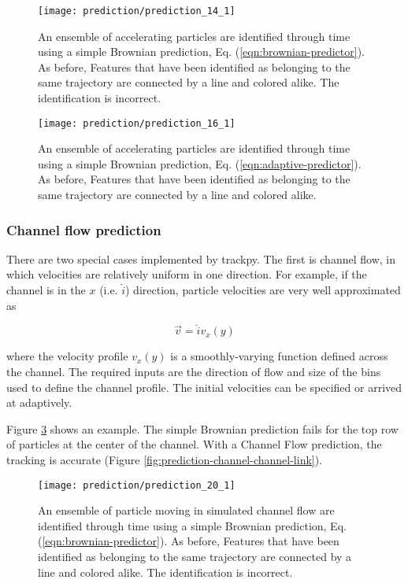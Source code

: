    \begin{figure}
    \centering
    \texttt{[image: prediction/prediction\_14\_1]}
    \caption{\label{fig:prediction-acceleration-brownian-link}An ensemble of accelerating particles are identified through time using a simple Brownian prediction, Eq. (\ref{eqn:brownian-predictor}). As before, Features that have been identified as belonging to the same trajectory are connected by a line and colored alike. The identification is incorrect.}
    \end{figure}
   

   \begin{figure}
    \centering
    \texttt{[image: prediction/prediction\_16\_1]}
    \caption{\label{fig:prediction-acceleration-adaptive-link}An ensemble of accelerating particles are identified through time using a simple Brownian prediction, Eq. (\ref{eqn:adaptive-predictor}). As before, Features that have been identified as belonging to the same trajectory are connected by a line and colored alike. }
    \end{figure}


    \subsubsection{Channel flow prediction}\label{channel-flow-prediction}

There are two special cases implemented by trackpy. The first is channel flow, in which velocities are relatively uniform in one
direction. For example, if the channel is in the $x$ (i.e. $\hat i$)
direction, particle velocities are very well approximated as

\begin{equation}
\vec v = \hat i v_x(y)
\end{equation}

\noindent where the velocity profile $v_x(y)$ is a smoothly-varying function
defined across the channel. The required inputs are the direction of flow and size of the bins used to
define the channel profile. The initial velocities can be specified or arrived at adaptively.

Figure \ref{fig:prediction-channel-brownian-link} shows an example. The simple Brownian prediction fails for the top row of particles at the center of the channel. With a Channel Flow prediction, the tracking is accurate (Figure \ref{fig:prediction-channel-channel-link}).

   \begin{figure}
    \centering
    \texttt{[image: prediction/prediction\_20\_1]}
    \caption{\label{fig:prediction-channel-brownian-link}An ensemble of particle moving in simulated channel flow are identified through time using a simple Brownian prediction, Eq. (\ref{eqn:brownian-predictor}). As before, Features that have been identified as belonging to the same trajectory are connected by a line and colored alike. The identification is incorrect.}
    \end{figure}

